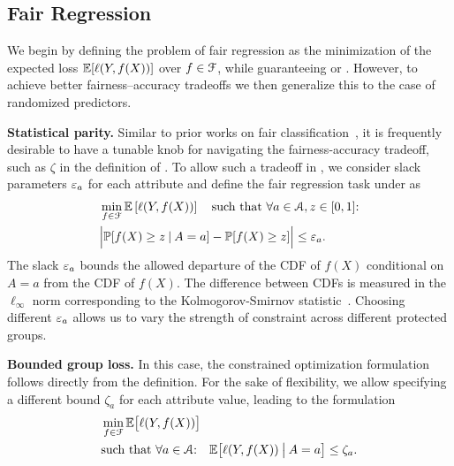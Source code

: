 \documentclass{article}
\begin{document}
\subsection{Fair Regression}
\label{sec:fair-reg}

We begin by defining the problem of fair regression as the minimization of the expected loss $\mathbb{E}[\ell(Y,f(X))]$ over $f \in \mathcal{F}$, while guaranteeing \sp or \epshort. However, to achieve better fairness--accuracy tradeoffs we then generalize this to the case of randomized predictors.

\textbf{Statistical parity.} Similar to prior works on fair classification~\mbox{\cite{agarwal2018reductions}}, it is frequently desirable to have a tunable knob for navigating the fairness-accuracy tradeoff, such as $\zeta$ in the definition of \ep. To allow such a tradeoff in \sp, we consider slack parameters $\varepsilon_a$ for each attribute and define the fair regression task under \sp as
%
\begin{align}
\notag
   &\min_{f \in \mathcal{F}} \mathbb{E}\left[\ell(Y,f(X))\right]
   \quad\text{such that }\forall a\in\mathcal{A}, z\in[0,1]{:}
\\
\label{eq:fair-reg:sp:0}
   &\Bigl\lvert\mathbb{P}[f(X)\ge z\mathbin{\vert} A=a] - \mathbb{P}[f(X)\ge z]\Bigr\rvert
   \leq \varepsilon_a.
\end{align}
%
The slack $\varepsilon_a$ bounds the allowed departure of the CDF of $f(X)$ conditional on $A=a$ from the CDF of $f(X)$. The difference between CDFs is measured in the $\ell_\infty$ norm corresponding
to the Kolmogorov-Smirnov statistic~\cite{lehmann2006testing}. Choosing different $\varepsilon_a$ allows us to vary the strength of constraint across different protected groups.

\textbf{Bounded group loss.} In this case, the constrained optimization formulation follows directly from the definition. For the sake of flexibility, we allow specifying a different bound $\zeta_a$ for each attribute value, leading to the formulation
%
\begin{align}
\notag
   &\min_{f \in \mathcal{F}} \mathbb{E}\bigl[\ell(Y,f(X))\bigr]
\\
\label{eq:fair-reg:ep:0}
   &\text{such that }\forall a\in\mathcal{A}{:}\quad
   \mathbb{E}\bigl[\ell(Y,f(X))\mathbin{\bigm\vert} A=a\bigr]\le\zeta_a.
\end{align}
\end{document}
